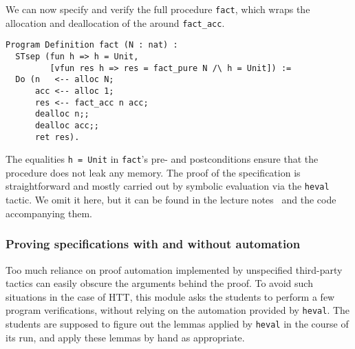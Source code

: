 \documentclass[blockstyle,preprint,nocopyrightspace]{sigplanconf}
\newcommand{\code}[1]{\lstinline{#1}}
\begin{document}
We can now specify and verify the full procedure \code{fact}, which
wraps the allocation and deallocation of the around \code{fact_acc}. 


\begin{lstlisting}
Program Definition fact (N : nat) : 
  STsep (fun h => h = Unit, 
         [vfun res h => res = fact_pure N /\ h = Unit]) := 
  Do (n   <-- alloc N;
      acc <-- alloc 1;
      res <-- fact_acc n acc;
      dealloc n;;
      dealloc acc;;
      ret res).
\end{lstlisting}
%
The equalities \code{h = Unit} in \code{fact}'s pre- and
postconditions ensure that the procedure does not leak any memory. The
proof of the specification is straightforward and mostly carried out
by symbolic evaluation via the \code{heval} tactic. We omit it here,
but it can be found in the lecture notes~\cite{Sergey:PnP} and the
code accompanying them.

\subsubsection{Proving specifications with and without automation}
\label{sec:proving-with-without}

Too much reliance on proof automation implemented by unspecified
third-party tactics can easily obscure the arguments behind the
proof. To avoid such situations in the case of HTT, this module asks
the students to perform a few program verifications, without relying
on the automation provided by \code{heval}. The students are supposed
to figure out the lemmas applied by \code{heval} in the course of its
run, and apply these lemmas by hand as appropriate.
\end{document}

